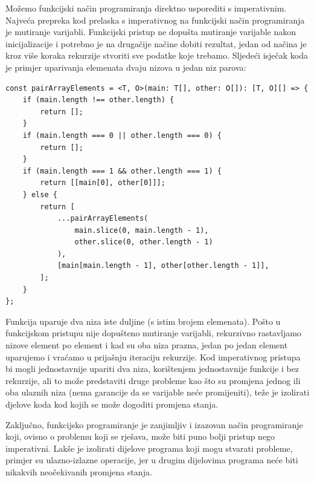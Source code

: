 \documentclass[]{foi}
\begin{document}
Možemo funkcijski način programiranja direktno usporediti s imperativnim.
Najveća prepreka kod prelaska s imperativnog na funkcijski način programiranja
je mutiranje varijabli. Funkcijski pristup ne dopušta mutiranje varijable
nakon inicijalizacije i potrebno je na drugačije načine dobiti rezultat, jedan
od načina je kroz više koraka rekurzije stvoriti sve podatke koje trebamo.
Sljedeći isječak koda je primjer uparivanja elemenata dvaju nizova u jedan
niz parova:
\begin{lstlisting}[caption={Funkcija za uparivanje dva niza}, label=lst:uparivanje]
const pairArrayElements = <T, O>(main: T[], other: O[]): [T, O][] => {
    if (main.length !== other.length) {
        return [];
    }
    if (main.length === 0 || other.length === 0) {
        return [];
    }
    if (main.length === 1 && other.length === 1) {
        return [[main[0], other[0]]];
    } else {
        return [
            ...pairArrayElements(
                main.slice(0, main.length - 1),
                other.slice(0, other.length - 1)
            ),
            [main[main.length - 1], other[other.length - 1]],
        ];
    }
};
\end{lstlisting}
Funkcija uparuje dva niza iste duljine (s istim brojem elemenata). Pošto u funkcijskom pristupu
nije dopušteno mutiranje varijabli, rekurzivno rastavljamo nizove element po element i kad
su oba niza prazna, jedan po jedan element uparujemo i vraćamo u prijašnju iteraciju rekurzije.
Kod imperativnog pristupa bi mogli jednostavnije upariti dva niza, korištenjem jednostavnije
funkcije i bez rekurzije, ali to može predstaviti druge probleme kao što su promjena jednog
ili oba ulaznih niza (nema garancije da se varijable neće promijeniti), teže je izolirati
djelove koda kod kojih se može dogoditi promjena stanja.

Zaključno, funkcijsko programiranje je zanjimljiv i izazovan način programiranje koji,
ovisno o problemu koji se rješava, može biti puno bolji pristup nego imperativni.
Lakše je izolirati dijelove programa koji mogu stvarati probleme, primjer su
ulazno-izlazne operacije, jer u drugim dijelovima programa neće biti nikakvih
neočekivanih promjena stanja.

\makebackmatter
\end{document}
